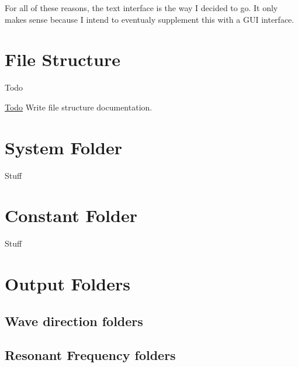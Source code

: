 For all of these reasons, the text interface is the way I decided to go. It only makes sense because I intend to eventualy supplement this with a G\-U\-I interface. \hypertarget{file_structure}{}\section{File Structure}\label{file_structure}
\begin{DoxyRefDesc}{Todo}
\item[\hyperlink{todo__todo000037}{Todo}]Write file structure documentation.\end{DoxyRefDesc}


\section*{System Folder}

Stuff

\section*{Constant Folder}

Stuff

\section*{Output Folders}

\subsection*{Wave direction folders}

\subsection*{Resonant Frequency folders}